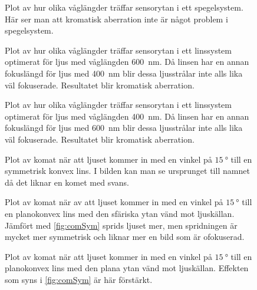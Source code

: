 \documentclass[a4paper]{article}
\begin{document}
\begin{figure}[h]
	\centering
	
	\caption{Plot av hur olika våglängder träffar sensorytan i ett spegelsystem. Här ser man att kromatisk aberration inte är något problem i spegelsystem.}
	\label{fig:chrMir}
\end{figure}
\begin{figure}[h]
	\centering
	
	\caption{Plot av hur olika våglängder träffar sensorytan i ett linssystem optimerat för ljus med våglängden \SI{600}{\nano\meter}. Då linsen har en annan fokuslängd för ljus med \SI{400}{\nano\meter} blir dessa ljusstrålar inte alls lika väl fokuserade. Resultatet blir kromatisk aberration.}
	\label{fig:chrLens1}
\end{figure}
\begin{figure}[h]
	\centering
	
	\caption{Plot av hur olika våglängder träffar sensorytan i ett linssystem optimerat för ljus med våglängden \SI{400}{\nano\meter}. Då linsen har en annan fokuslängd för ljus med \SI{600}{\nano\meter} blir dessa ljusstrålar inte alls lika väl fokuserade. Resultatet blir kromatisk aberration.}
	\label{fig:chrLens2}
\end{figure}
\begin{figure}[h]
	\centering
	
	\caption{Plot av komat när att ljuset kommer in med en vinkel på $\SI{15}{\degree}$ till en symmetrisk konvex lins. I bilden kan man se ursprunget till namnet då det liknar en komet med svans.}
	\label{fig:comSym}
\end{figure}
\begin{figure}[h]
	\centering
	
	\caption{Plot av komat när av att ljuset kommer in med en vinkel på $\SI{15}{\degree}$ till en planokonvex lins med den sfäriska ytan vänd mot ljuskällan. Jämfört med \autoref{fig:comSym} sprids ljuset mer, men spridningen är mycket mer symmetrisk och liknar mer en bild som är ofokuserad.}
	\label{fig:comP1}
\end{figure}
\begin{figure}[h]
	\centering
	
	\caption{Plot av komat när att ljuset kommer in med en vinkel på $\SI{15}{\degree}$ till en planokonvex lins med den plana ytan vänd mot ljuskällan. Effekten som syns i \autoref{fig:comSym} är här förstärkt.}
	\label{fig:comM1}
\end{figure}

\FloatBarrier

 
 {}
 
\end{document}
